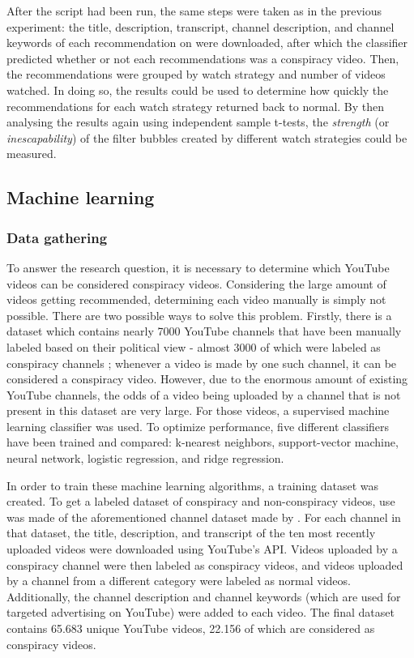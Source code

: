 \documentclass[../main.tex]{subfiles}
\begin{document}
\vspace{0.25in}

\linenumbers

\noindent After the script had been run, the same steps were taken as in the previous experiment: the 
title, description, transcript, channel description, and channel keywords of each recommendation
on were downloaded, after which the classifier predicted whether or not each recommendations was a 
conspiracy video. Then, the recommendations were grouped by watch strategy and number of videos watched. In
doing so, the results could be used to determine how quickly the recommendations for each watch strategy 
returned back to normal. By then analysing the results again using independent sample t-tests, the 
\textit{strength} (or \textit{inescapability}) of the filter bubbles created by different watch strategies 
could be measured.

\subsection{Machine learning} \label{Machine Learning}
\subsubsection{Data gathering}
To answer the research question, it is necessary to determine which YouTube videos can be considered
conspiracy videos. Considering the large amount of videos getting recommended, determining each video
manually is simply not possible. There are two possible ways to solve this problem. Firstly, there is a
dataset which contains nearly 7000 YouTube channels that have been manually labeled based on their
political view - almost 3000 of which were labeled as conspiracy channels \citep{ledwich2020algorithmic};
whenever a video is made by one such channel, it can be considered a conspiracy video. However, due to
the enormous amount of existing YouTube channels, the odds of a video being uploaded by a channel that
is not present in this dataset are very large. For those videos, a supervised machine learning
classifier was used. To optimize performance, five different classifiers have been trained and compared:
k-nearest neighbors, support-vector machine, neural network, logistic regression, and ridge regression. 

In order to train these machine learning algorithms, a training dataset was created. To get a labeled
dataset of conspiracy and non-conspiracy videos, use was made of the aforementioned channel dataset made
by \citet{ledwich2020algorithmic}. For each channel in that dataset, the title, description, and
transcript of the ten most recently uploaded videos were downloaded using YouTube's API. Videos uploaded
by a conspiracy channel were then labeled as conspiracy videos, and videos uploaded by a channel from a
different category were labeled as normal videos. Additionally, the channel description and channel
keywords (which are used for targeted advertising on YouTube) were added to each video. The final
dataset contains 65.683 unique YouTube videos, 22.156 of which are considered as conspiracy videos. 
\end{document}
